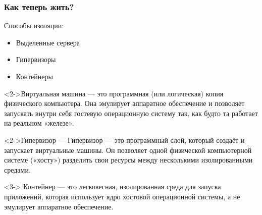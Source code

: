 \documentclass[9pt, aspectratio=1610]{beamer}
\begin{document}
\begin{frame}\frametitle{Как теперь жить?}
	
	Способы изоляции:
	\begin{itemize}
		\item<1-> Выделенные сервера
		\item<2-> Гипервизоры
		\item<3-> Контейнеры
	\end{itemize}
	
	\begin{alertblock}<2->{Виртуальная машина ---}
		это программная (или логическая) копия физического компьютера. Она эмулирует аппаратное обеспечение и позволяет запускать внутри себя гостевую операционную систему так, как будто та работает на реальном «железе».
	\end{alertblock}

	\begin{alertblock}<2->{Гипервизор --- }
		Гипервизор --- это программный слой, который создаёт и запускает виртуальные машины. Он позволяет одной физической компьютерной системе («хосту») разделить свои ресурсы между несколькими изолированными средами.
	\end{alertblock}
	
	
	
	\begin{alertblock}<3->{	Контейнер ---}
		 это легковесная, изолированная среда для запуска приложений, которая использует ядро хостовой операционной системы, а не эмулирует аппаратное обеспечение.
	\end{alertblock}
	
	
	
\end{frame}
\end{document}
